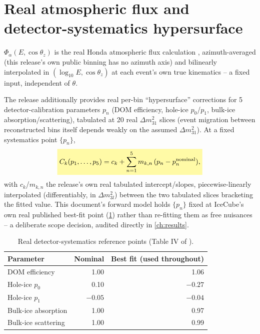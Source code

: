 \section{Real atmospheric flux and detector-systematics hypersurface}
\label{sec:flux-hypersurface}


\begin{theorybox}
$\Phi_\alpha(E,\cos\theta_z)$ is the real Honda atmospheric flux
calculation \parencite{Honda2015Flux}, azimuth-averaged (this release's
own public binning has no azimuth axis) and bilinearly interpolated in
$(\log_{10}E,\cos\theta_z)$ at each event's own true kinematics -- a fixed
input, independent of $\theta$.

The release additionally provides real per-bin ``hypersurface''
corrections for 5 detector-calibration parameters $p_n$ (DOM efficiency,
hole-ice $p_0$/$p_1$, bulk-ice absorption/scattering), tabulated at 20 real
$\Delta m^2_{31}$ slices (event migration between reconstructed bins
itself depends weakly on the assumed $\Delta m^2_{31}$). At a fixed
systematics point $\{p_n\}$,
\begin{equation}
  \keyresult{C_k(p_1,\dots,p_5) = c_k + \sum_{n=1}^5 m_{k,n}\,(p_n-p_n^{\rm nominal}),}
  \label{eq:hypersurface}
\end{equation}
with $c_k$/$m_{k,n}$ the release's own real tabulated intercept/slopes,
piecewise-linearly interpolated (differentiably, in $\Delta m^2_{3l}$)
between the two tabulated slices bracketing the fitted value. This
document's forward model holds $\{p_n\}$ fixed at IceCube's own real
published best-fit point (\cref{tab:bestfit-systematics}) rather than
re-fitting them as free nuisances -- a deliberate scope decision, audited
directly in \cref{ch:results}.
\end{theorybox}

\begin{table}[htb]
\centering
\caption{Real detector-systematics reference points (Table IV of \cite{Abbasi2023IceCube}).}
\label{tab:bestfit-systematics}
\begin{tabular}{@{}lrr@{}}
\toprule
Parameter & Nominal & Best fit (used throughout) \\
\midrule
DOM efficiency & 1.00 & 1.06 \\
Hole-ice $p_0$ & 0.10 & $-0.27$ \\
Hole-ice $p_1$ & $-0.05$ & $-0.04$ \\
Bulk-ice absorption & 1.00 & 0.97 \\
Bulk-ice scattering & 1.00 & 0.99 \\
\bottomrule
\end{tabular}
\end{table}

